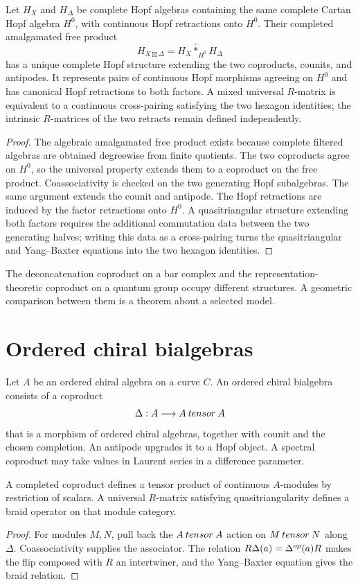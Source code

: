 \begin{theorem}
Let $H_X$ and $H_\Delta$ be complete Hopf algebras containing the same complete Cartan Hopf algebra $H^0$, with continuous Hopf retractions onto $H^0$.  Their completed amalgamated free product
\[
 H_{X\boxtimes\Delta}
 =H_X\widehat *_{H^0}H_\Delta
\]
has a unique complete Hopf structure extending the two coproducts, counits, and antipodes.  It represents pairs of continuous Hopf morphisms agreeing on $H^0$ and has canonical Hopf retractions to both factors.  A mixed universal $R$-matrix is equivalent to a continuous cross-pairing satisfying the two hexagon identities; the intrinsic $R$-matrices of the two retracts remain defined independently.
\end{theorem}
\begin{proof}
The algebraic amalgamated free product exists because complete filtered algebras are obtained degreewise from finite quotients.  The two coproducts agree on $H^0$, so the universal property extends them to a coproduct on the free product.  Coassociativity is checked on the two generating Hopf subalgebras.  The same argument extends the counit and antipode.  The Hopf retractions are induced by the factor retractions onto $H^0$.  A quasitriangular structure extending both factors requires the additional commutation data between the two generating halves; writing this data as a cross-pairing turns the quasitriangular and Yang--Baxter equations into the two hexagon identities.
\end{proof}

The deconcatenation coproduct on a bar complex and the representation-theoretic coproduct on a quantum group occupy different structures. A geometric comparison between them is a theorem about a selected model.

\chapter{Ordered chiral bialgebras}
Let $A$ be an ordered chiral algebra on a curve $C$. An ordered chiral bialgebra consists of a coproduct
\[
 \Delta:A\longrightarrow A\mathbin{tensor} A
\]
that is a morphism of ordered chiral algebras, together with counit and the chosen completion. An antipode upgrades it to a Hopf object. A spectral coproduct may take values in Laurent series in a difference parameter.

\begin{theorem}
A completed coproduct defines a tensor product of continuous $A$-modules by restriction of scalars. A universal $R$-matrix satisfying quasitriangularity defines a braid operator on that module category.
\end{theorem}
\begin{proof}
For modules $M,N$, pull back the $A\mathbin{tensor} A$ action on $M\mathbin{tensor} N$ along $\Delta$. Coassociativity supplies the associator. The relation $R\Delta(a)=\Delta^{op}(a)R$ makes the flip composed with $R$ an intertwiner, and the Yang--Baxter equation gives the braid relation.
\end{proof}

